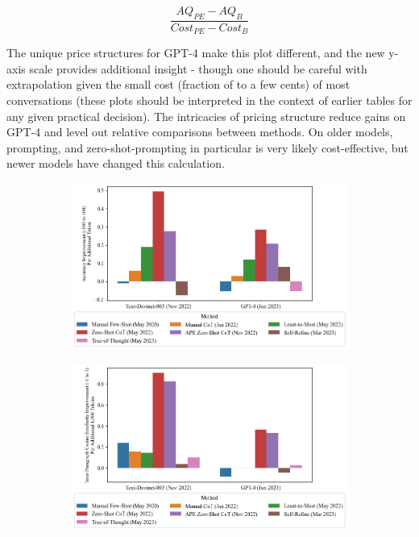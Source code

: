 \documentclass[11pt]{article}
\begin{document}
\begin{displaymath}
  \frac{AQ_{PE} - AQ_{B}}{Cost_{PE} - Cost_{B}}
\end{displaymath}

The unique price structures for GPT-4 make this plot different, and the new y-axis scale provides additional insight - though one should be careful with extrapolation given the small cost (fraction of to a few cents) of most conversations (these plots should be interpreted in the context of earlier tables for any given practical decision). The intricacies of pricing structure reduce gains on GPT-4 and level out relative comparisons between methods. On older models, prompting, and zero-shot-prompting in particular is very likely cost-effective, but newer models have changed this calculation.


\begin{figure}
  \caption{Gains Per Token v. Direct Prompting}
  \begin{subfigure}[h]{0.4925\textwidth}
      \centering
      \includegraphics[width=0.95\hsize]{../Output/gsm8k_change_in_accuracy_quality_per_change_in_conversation_length_sorted_by_technique_age.png} 
  \end{subfigure}
  \begin{subfigure}[h]{0.4925\textwidth}
      \centering
      \includegraphics[width=0.95\hsize]{../Output/cw_change_in_accuracy_quality_per_change_in_conversation_length_sorted_by_technique_age_transformed.png}
  \end{subfigure}
  \hfill
  \label{fig:gains_v_dp}
\end{figure}
\end{document}
